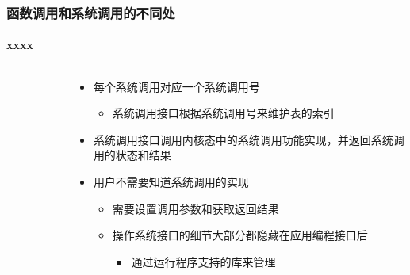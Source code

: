 \begin{frame}
	\frametitle{函数调用和系统调用的不同处}
	\framesubtitle{xxxx}
    \begin{columns}
    \begin{column}{0.5\textwidth}
        \begin{figure}
        \end{figure}
    \end{column}
    \begin{column}{0.5\textwidth}
	    \begin{itemize}
		    \item 每个系统调用对应一个系统调用号
		    \begin{itemize}
		    	\item 系统调用接口根据系统调用号来维护表的索引
	    	\end{itemize}
		    \item 系统调用接口调用内核态中的系统调用功能实现，并返回系统调用的状态和结果
		    \item 用户不需要知道系统调用的实现
	 		\begin{itemize}
		    	\item 需要设置调用参数和获取返回结果
		    	\item 操作系统接口的细节大部分都隐藏在应用编程接口后
			    \begin{itemize}
		    		\item 通过运行程序支持的库来管理
	    		\end{itemize}
			\end{itemize}
	    \end{itemize}
    \end{column}
    \end{columns}
\end{frame}
